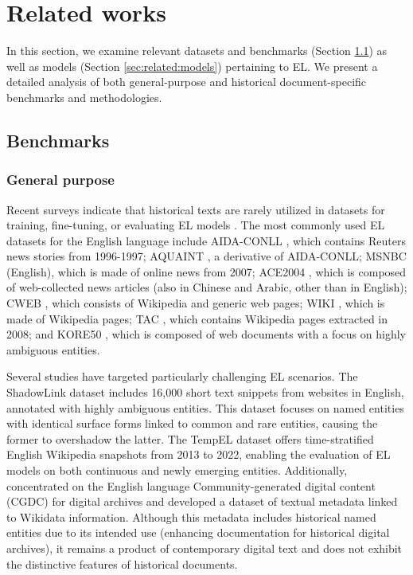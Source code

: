 \section{Related works}
\label{sec:related}
In this section, we examine relevant datasets and benchmarks (Section \ref{sec:related:bench}) as well as models (Section \ref{sec:related:models}) pertaining to EL. We present a detailed analysis of both general-purpose and historical document-specific benchmarks and methodologies.

\subsection{Benchmarks} \label{sec:related:bench}
\subsubsection*{General purpose}
Recent surveys indicate that historical texts are rarely utilized in datasets for training, fine-tuning, or evaluating EL models \citep{mollerSurveyEnglishEntity2022, guellilEntityLinkingEnglish2024c}. The most commonly used EL datasets for the English language include AIDA-CONLL \citep{hoffart-etal-2011-robust}, which contains Reuters news stories from 1996-1997; AQUAINT \citep{Graff2002Aquaint}, a derivative of AIDA-CONLL; MSNBC (English), which is made of online news from 2007; ACE2004 \citep{Mitchell2005}, which is composed of web-collected news articles (also in Chinese and Arabic, other than in English); CWEB \citep{Gabrilovich2013}, which consists of Wikipedia and generic web pages; WIKI \citep{10.3233/SW-170273}, which is made of Wikipedia pages; TAC \citep{TAC2010}, which contains Wikipedia pages extracted in 2008; and KORE50 \citep{KORE2012}, which is composed of web documents with a focus on highly ambiguous entities.

Several studies have targeted particularly challenging EL scenarios. The ShadowLink dataset \citep{provatorova-etal-2021-robustness} includes 16,000 short text snippets from websites in English, annotated with highly ambiguous entities. This dataset focuses on named entities with identical surface forms linked to common and rare entities, causing the former to overshadow the latter. The TempEL dataset \citep{zaporojets2022tempel} offers time-stratified English Wikipedia snapshots from 2013 to 2022, enabling the evaluation of EL models on both continuous and newly emerging entities. Additionally, \citet{benkhedda-etal-2024-enriching} concentrated on the English language Community-generated digital content (CGDC) for digital archives and developed a dataset of textual metadata linked to Wikidata information. Although this metadata includes historical named entities due to its intended use (enhancing documentation for historical digital archives), it remains a product of contemporary digital text and does not exhibit the distinctive features of historical documents.

